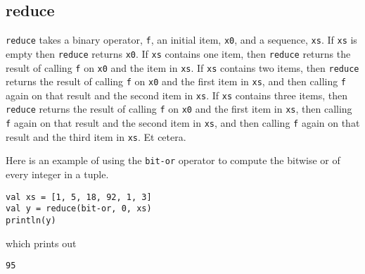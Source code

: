 \documentclass[10pt,oneside]{book}
\begin{document}
\subsection*{reduce}
\texttt{\frenchspacing reduce} takes a binary operator, \texttt{\frenchspacing f}, an initial item, \texttt{\frenchspacing x0}, and a sequence, \texttt{\frenchspacing xs}. If \texttt{\frenchspacing xs} is empty then \texttt{\frenchspacing reduce} returns \texttt{\frenchspacing x0}. If \texttt{\frenchspacing xs} contains one item, then \texttt{\frenchspacing reduce} returns the result of calling \texttt{\frenchspacing f} on \texttt{\frenchspacing x0} and the item in \texttt{\frenchspacing xs}. If \texttt{\frenchspacing xs} contains two items, then \texttt{\frenchspacing reduce} returns the result of calling \texttt{\frenchspacing f} on \texttt{\frenchspacing x0} and the first item in \texttt{\frenchspacing xs}, and then calling \texttt{\frenchspacing f} again on that result and the second item in \texttt{\frenchspacing xs}. If \texttt{\frenchspacing xs} contains three items, then \texttt{\frenchspacing reduce} returns the result of calling \texttt{\frenchspacing f} on \texttt{\frenchspacing x0} and the first item in \texttt{\frenchspacing xs}, then calling \texttt{\frenchspacing f} again on that result and the second item in \texttt{\frenchspacing xs}, and then calling \texttt{\frenchspacing f} again on that result and the third item in \texttt{\frenchspacing xs}. Et cetera. 

Here is an example of using the \texttt{\frenchspacing bit-or} operator to compute the bitwise or of every integer in a tuple.
\begin{lstlisting}
val xs = [1, 5, 18, 92, 1, 3]
val y = reduce(bit-or, 0, xs)
println(y)
\end{lstlisting}
which prints out
\begin{lstlisting}
95
\end{lstlisting}
\end{document}
